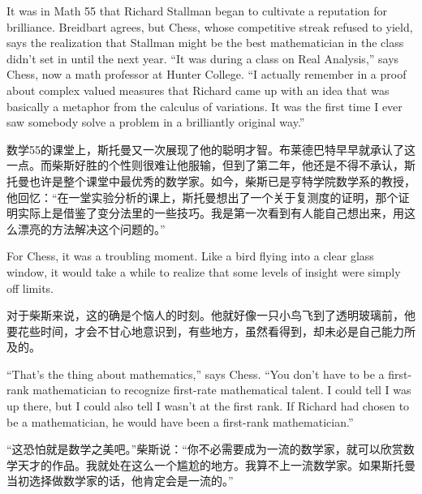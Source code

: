 \ifdefined\eng
It was in Math 55 that Richard Stallman began to cultivate a reputation for brilliance. Breidbart agrees, but Chess, whose competitive streak refused to yield, says the realization that Stallman might be the best mathematician in the class didn't set in until the next year. ``It was during a class on Real Analysis,'' says Chess, now a math professor at Hunter College. ``I actually remember in a proof about complex valued measures that Richard came up with an idea that was basically a metaphor from the calculus of variations. It was the first time I ever saw somebody solve a problem in a brilliantly original way.''
\fi

\ifdefined\chs
数学55的课堂上，斯托曼又一次展现了他的聪明才智。布莱德巴特早早就承认了这一点。而柴斯好胜的个性则很难让他服输，但到了第二年，他还是不得不承认，斯托曼也许是整个课堂中最优秀的数学家。如今，柴斯已是亨特学院数学系的教授，他回忆：``在一堂实验分析的课上，斯托曼想出了一个关于复测度的证明，那个证明实际上是借鉴了变分法里的一些技巧。我是第一次看到有人能自己想出来，用这么漂亮的方法解决这个问题的。''
\fi

\ifdefined\eng
For Chess, it was a troubling moment. Like a bird flying into a clear glass window, it would take a while to realize that some levels of insight were simply off limits.
\fi

\ifdefined\chs
对于柴斯来说，这的确是个恼人的时刻。他就好像一只小鸟飞到了透明玻璃前，他要花些时间，才会不甘心地意识到，有些地方，虽然看得到，却未必是自己能力所及的。
\fi

\ifdefined\eng
``That's the thing about mathematics,'' says Chess. ``You don't have to be a first-rank mathematician to recognize first-rate mathematical talent. I could tell I was up there, but I could also tell I wasn't at the first rank. If Richard had chosen to be a mathematician, he would have been a first-rank mathematician.''
\fi

\ifdefined\chs
``这恐怕就是数学之美吧。''柴斯说：``你不必需要成为一流的数学家，就可以欣赏数学天才的作品。我就处在这么一个尴尬的地方。我算不上一流数学家。如果斯托曼当初选择做数学家的话，他肯定会是一流的。''
\fi

